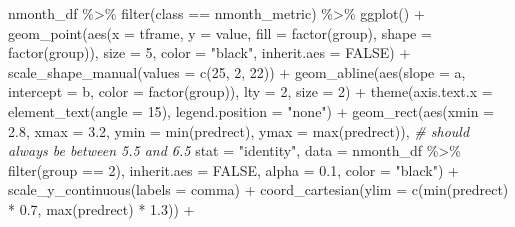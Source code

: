 \documentclass[
]{article}
\newenvironment{Shaded}{\begin{snugshade}}{\end{snugshade}}
\newcommand{\AttributeTok}[1]{\textcolor[rgb]{0.77,0.63,0.00}{#1}}
\newcommand{\CommentTok}[1]{\textcolor[rgb]{0.56,0.35,0.01}{\textit{#1}}}
\newcommand{\ConstantTok}[1]{\textcolor[rgb]{0.00,0.00,0.00}{#1}}
\newcommand{\DecValTok}[1]{\textcolor[rgb]{0.00,0.00,0.81}{#1}}
\newcommand{\FloatTok}[1]{\textcolor[rgb]{0.00,0.00,0.81}{#1}}
\newcommand{\FunctionTok}[1]{\textcolor[rgb]{0.00,0.00,0.00}{#1}}
\newcommand{\NormalTok}[1]{#1}
\newcommand{\SpecialCharTok}[1]{\textcolor[rgb]{0.00,0.00,0.00}{#1}}
\newcommand{\StringTok}[1]{\textcolor[rgb]{0.31,0.60,0.02}{#1}}
\begin{document}
\begin{Shaded}
\begin{Highlighting}[]
\NormalTok{nmonth\_df }\SpecialCharTok{\%\textgreater{}\%}
  \FunctionTok{filter}\NormalTok{(class }\SpecialCharTok{==}\NormalTok{ nmonth\_metric) }\SpecialCharTok{\%\textgreater{}\%}
  \FunctionTok{ggplot}\NormalTok{() }\SpecialCharTok{+} 
  \FunctionTok{geom\_point}\NormalTok{(}\FunctionTok{aes}\NormalTok{(}\AttributeTok{x =}\NormalTok{ tframe, }\AttributeTok{y =}\NormalTok{ value, }\AttributeTok{fill =} \FunctionTok{factor}\NormalTok{(group), }\AttributeTok{shape =} \FunctionTok{factor}\NormalTok{(group)),}
             \AttributeTok{size =} \DecValTok{5}\NormalTok{,}
             \AttributeTok{color =} \StringTok{"black"}\NormalTok{,}
             \AttributeTok{inherit.aes =} \ConstantTok{FALSE}\NormalTok{) }\SpecialCharTok{+}
  \FunctionTok{scale\_shape\_manual}\NormalTok{(}\AttributeTok{values =} \FunctionTok{c}\NormalTok{(}\DecValTok{25}\NormalTok{, }\DecValTok{2}\NormalTok{, }\DecValTok{22}\NormalTok{)) }\SpecialCharTok{+}
  \FunctionTok{geom\_abline}\NormalTok{(}\FunctionTok{aes}\NormalTok{(}\AttributeTok{slope =}\NormalTok{ a, }\AttributeTok{intercept =}\NormalTok{ b, }\AttributeTok{color =} \FunctionTok{factor}\NormalTok{(group)),}
             \AttributeTok{lty =} \DecValTok{2}\NormalTok{, }\AttributeTok{size =} \DecValTok{2}\NormalTok{) }\SpecialCharTok{+}
  \FunctionTok{theme}\NormalTok{(}\AttributeTok{axis.text.x =} \FunctionTok{element\_text}\NormalTok{(}\AttributeTok{angle =} \DecValTok{15}\NormalTok{),}
        \AttributeTok{legend.position =} \StringTok{"none"}\NormalTok{) }\SpecialCharTok{+}
  \FunctionTok{geom\_rect}\NormalTok{(}\FunctionTok{aes}\NormalTok{(}\AttributeTok{xmin =} \FloatTok{2.8}\NormalTok{, }\AttributeTok{xmax =} \FloatTok{3.2}\NormalTok{, }\AttributeTok{ymin =} \FunctionTok{min}\NormalTok{(predrect), }\AttributeTok{ymax =} \FunctionTok{max}\NormalTok{(predrect)),  }\CommentTok{\# should always be between 5.5 and 6.5}
            \AttributeTok{stat =} \StringTok{"identity"}\NormalTok{, }
            \AttributeTok{data =}\NormalTok{ nmonth\_df }\SpecialCharTok{\%\textgreater{}\%}
             \FunctionTok{filter}\NormalTok{(group }\SpecialCharTok{==} \DecValTok{2}\NormalTok{), }
            \AttributeTok{inherit.aes =} \ConstantTok{FALSE}\NormalTok{, }
            \AttributeTok{alpha =} \FloatTok{0.1}\NormalTok{,}
            \AttributeTok{color =} \StringTok{"black"}\NormalTok{) }\SpecialCharTok{+}
  \FunctionTok{scale\_y\_continuous}\NormalTok{(}\AttributeTok{labels =}\NormalTok{ comma) }\SpecialCharTok{+} 
  \FunctionTok{coord\_cartesian}\NormalTok{(}\AttributeTok{ylim =} \FunctionTok{c}\NormalTok{(}\FunctionTok{min}\NormalTok{(predrect) }\SpecialCharTok{*} \FloatTok{0.7}\NormalTok{, }\FunctionTok{max}\NormalTok{(predrect) }\SpecialCharTok{*} \FloatTok{1.3}\NormalTok{)) }\SpecialCharTok{+}

\end{Highlighting}
\end{Shaded}
\end{document}
